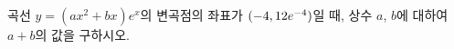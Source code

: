 곡선 $y=(ax^2+bx)e^x$의 변곡점의 좌표가 $(-4{,}\mkern3mu\mathopen{}12e^{-4})$일 때, 상수 $a$, $b$에 대하여 $a+b$의 값을 구하시오.
